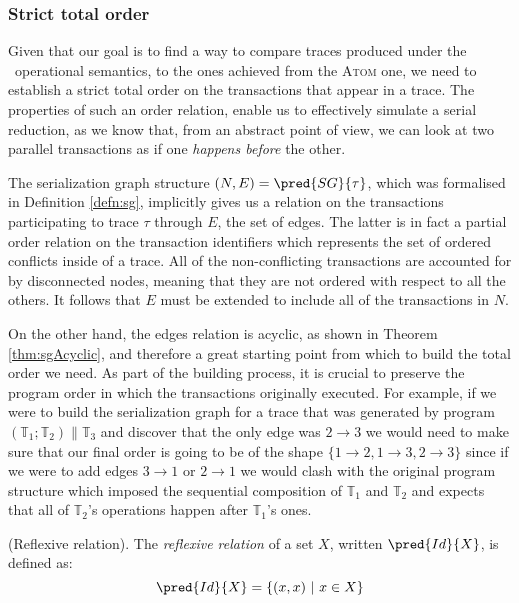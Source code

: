 \subsubsection{Strict total order}

Given that our goal is to find a way to compare traces produced under the \tpl\ operational semantics, to the ones achieved from the \textsc{Atom} one, we need to establish a strict total order on the transactions that appear in a trace. The properties of such an order relation, enable us to effectively simulate a serial reduction, as we know that, from an abstract point of view, we can look at two parallel transactions as if one \textit{happens before} the other.

The serialization graph structure $(N, E) = \pred{SG}{\tau}$, which was formalised in Definition \ref{defn:sg}, implicitly gives us a relation on the transactions participating to trace $\tau$ through $E$, the set of edges. The latter is in fact a partial order relation on the transaction identifiers which represents the set of ordered conflicts inside of a trace. All of the non-conflicting transactions are accounted for by disconnected nodes, meaning that they are not ordered with respect to all the others. It follows that $E$ must be extended to include all of the transactions in $N$.

On the other hand, the edges relation is acyclic, as shown in Theorem \ref{thm:sgAcyclic}, and therefore a great starting point from which to build the total order we need. As part of the building process, it is crucial to preserve the program order in which the transactions originally executed. For example, if we were to build the serialization graph for a trace that was generated by program $\left( \mathds{T}_1 ; \mathds{T}_2 \right) \| \mathds{T}_3$ and discover that the only edge was $2 \rightarrow 3$ we would need to make sure that our final order is going to be of the shape $\{ 1 \rightarrow 2, 1 \rightarrow 3, 2 \rightarrow 3 \}$ since if we were to add edges $3 \rightarrow 1$ or $2 \rightarrow 1$ we would clash with the original program structure which imposed the sequential composition of $\mathds{T}_1$ and $\mathds{T}_2$ and expects that all of $\mathds{T}_2$'s operations happen after $\mathds{T}_1$'s ones.

\begin{defn}
	(Reflexive relation).
	The \emph{reflexive relation} of a set $X$, written $\pred{Id}{X}$, is defined as:
	\[
		\pred{Id}{X} = \{ (x, x)\ |\ x \in X \}
	\]
\end{defn}

